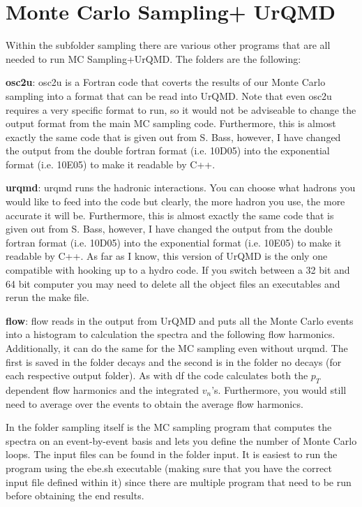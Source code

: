 \documentclass[article]{revtex4-1}
\begin{document}
\section{Monte Carlo Sampling+ UrQMD}\label{sec:MCsurqmd}

Within the subfolder sampling there are various other programs that are all needed to run MC Sampling+UrQMD.  The folders are the following:

{\bf osc2u}: osc2u is a Fortran code that coverts the results of our Monte Carlo sampling into a format that can be read into UrQMD.  Note that even osc2u requires a very specific format to run, so it would not be adviseable to change the output format from the main MC sampling code.  Furthermore, this is almost exactly the same code that is given out from S. Bass, however, I have changed the output from the double fortran format (i.e. 10D05) into the exponential format (i.e. 10E05) to make it readable by C++.  

{\bf urqmd}: urqmd runs the hadronic interactions.  You can choose what hadrons you would like to feed into the code but clearly, the more hadron you use, the more accurate it will be.  Furthermore, this is almost exactly the same code that is given out from S. Bass, however, I have changed the output from the double fortran format (i.e. 10D05) into the exponential format (i.e. 10E05) to make it readable by C++.  As far as I know, this version of UrQMD is the only one compatible with hooking up to a hydro code. If you switch between a 32 bit and 64 bit computer you may need to delete all the object files an executables and rerun the make file. 

{\bf flow}: flow reads in the output from UrQMD and puts all the Monte Carlo events into a histogram to calculation the spectra and the following flow harmonics.  Additionally, it can do the same for the MC sampling even without urqmd.  The first is saved in the folder decays and the second is in the folder no decays (for each respective output folder).  As with df the code calculates both the $p_T$ dependent flow harmonics and the integrated $v_n$'s.  Furthermore, you would still need to average over the events to obtain the average flow harmonics.

In the folder sampling itself is the MC sampling program that computes the spectra on an event-by-event basis and lets you define the number of Monte Carlo loops.  The input files can be found in the folder input.  It is easiest to run the program using the ebe.sh executable  (making sure that you have the correct input file defined within it) since there are multiple program that need to be run before obtaining the end results.
\end{document}

